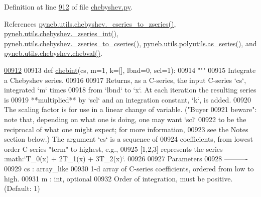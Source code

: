 Definition at line \hyperlink{chebyshev_8py_source_l00912}{912} of file \hyperlink{chebyshev_8py_source}{chebyshev.\-py}.



References \hyperlink{chebyshev_8py_source_l00100}{pyneb.\-utils.\-chebyshev.\-\_\-cseries\-\_\-to\-\_\-zseries()}, \hyperlink{chebyshev_8py_source_l00271}{pyneb.\-utils.\-chebyshev.\-\_\-zseries\-\_\-int()}, \hyperlink{chebyshev_8py_source_l00124}{pyneb.\-utils.\-chebyshev.\-\_\-zseries\-\_\-to\-\_\-cseries()}, \hyperlink{polyutils_8py_source_l00115}{pyneb.\-utils.\-polyutils.\-as\-\_\-series()}, and \hyperlink{chebyshev_8py_source_l01018}{pyneb.\-utils.\-chebyshev.\-chebval()}.


\begin{DoxyCode}
\hypertarget{namespacepyneb_1_1utils_1_1chebyshev_l00912}{}\hyperlink{namespacepyneb_1_1utils_1_1chebyshev_a233e686a07b9935c74ce1e053f0c5f5f}{00912} 
00913 \textcolor{keyword}{def }\hyperlink{namespacepyneb_1_1utils_1_1chebyshev_a233e686a07b9935c74ce1e053f0c5f5f}{chebint}(cs, m=1, k=[], lbnd=0, scl=1):
00914     \textcolor{stringliteral}{"""}
00915 \textcolor{stringliteral}{    Integrate a Chebyshev series.}
00916 \textcolor{stringliteral}{}
00917 \textcolor{stringliteral}{    Returns, as a C-series, the input C-series `cs`, integrated `m` times}
00918 \textcolor{stringliteral}{    from `lbnd` to `x`.  At each iteration the resulting series is}
00919 \textcolor{stringliteral}{    **multiplied** by `scl` and an integration constant, `k`, is added.}
00920 \textcolor{stringliteral}{    The scaling factor is for use in a linear change of variable.  ("Buyer}
00921 \textcolor{stringliteral}{    beware": note that, depending on what one is doing, one may want `scl`}
00922 \textcolor{stringliteral}{    to be the reciprocal of what one might expect; for more information,}
00923 \textcolor{stringliteral}{    see the Notes section below.)  The argument `cs` is a sequence of}
00924 \textcolor{stringliteral}{    coefficients, from lowest order C-series "term" to highest, e.g.,}
00925 \textcolor{stringliteral}{    [1,2,3] represents the series :math:`T\_0(x) + 2T\_1(x) + 3T\_2(x)`.}
00926 \textcolor{stringliteral}{}
00927 \textcolor{stringliteral}{    Parameters}
00928 \textcolor{stringliteral}{    ----------}
00929 \textcolor{stringliteral}{    cs : array\_like}
00930 \textcolor{stringliteral}{        1-d array of C-series coefficients, ordered from low to high.}
00931 \textcolor{stringliteral}{    m : int, optional}
00932 \textcolor{stringliteral}{        Order of integration, must be positive. (Default: 1)}

\end{DoxyCode}
